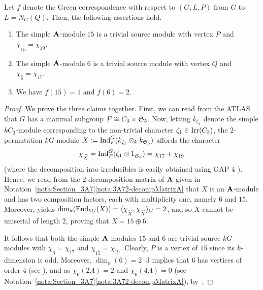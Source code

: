 \begin{lem}\label{lem:tsmInA}
Let $f$ denote the Green correspondence with respect to $(G,L,P)$ from $G$ to $L=N_G(Q)$. Then, the following assertions hold.
\begin{enumerate}[label={\rm(\alph*)}]
    \item The simple ${\mathbf{A}}$-module $15$ is a trivial source module with vertex $P$ and $\chi^{}_{\widehat{15}}=\chi^{}_{19}$.
    \item The simple ${\mathbf{A}}$-module $6$ is
    a trivial source module with vertex $Q$ and $\chi^{}_{\widehat{6}}=\chi^{}_{17}$. 
    \item We have $f(15)=1$ and $f(6)=2$. 
\end{enumerate}
\end{lem}

\begin{proof}
We prove the three claims together. First, we can read from the ATLAS \cite[p.10]{ATLAS} that $G$ has a maximal subgroup $F\cong C_3\times {\mathfrak{S}}_5$. Now, letting $k_{\zeta_1}$ denote the simple $kC_3$-module corresponding to the non-trivial character $\zeta_1\in\operatorname{Irr}(C_3)$, the $2$-permutation $kG$-module $X:=\operatorname{Ind}_F^{G}(k_{\zeta_1}\otimes_kk_{{\mathfrak{S}}_5})$ affords the character 
    \[
        \chi^{}_{\widehat{X}}=\operatorname{Ind}_F^{G}(\zeta_1\otimes 1^{}_{{\mathfrak{S}}_5})=\chi^{}_{17}+\chi^{}_{19}\,
    \] 
(where the decomposition into irreducibles is easily obtained using GAP 4 \cite{GAP}). Hence, we read from the $2$-decomposition matrix of ${\mathbf{A}}$ given in Notation~\ref{nota:Section_3A7}\ref{nota:3A72-decompMatrixA} that $X$ is an ${\mathbf{A}}$-module and  has two composition factors, each with multiplicity one,  namely $6$ and $15$.
Moreover, \cite[II Theorem 12.4]{LandrockBook} yields
$\dim_k(\operatorname{End}_{kG}(X))=\langle \chi^{}_{\widehat{X}} ,\chi^{}_{\widehat{X}}\rangle_G=2$, and so $X$ cannot be uniserial of length $2$, proving that $X=15\oplus 6$.
\par
It follows that both the simple ${\mathbf{A}}$-modules $15$ and $6$ are trivial source $kG$-modules with $\chi^{}_{\widehat{6}}=\chi^{}_{17}$ and $\chi^{}_{\widehat{15}}=\chi^{}_{19}$.  Clearly, $P$ is a vertex of $15$ since its $k$-dimension is odd. Moreover, $\dim_k(6)=2\cdot 3$ implies that $6$ has vertices of order $4$ (see \cite[Lemma~2.2]{Okuyama91}), and as $\chi^{}_{\widehat{6}}(2A)=2$ and $\chi^{}_{\widehat{6}}(4A)=0$ (see Notation~\ref{nota:Section_3A7}\ref{nota:3A72-decompMatrixA}), by~\cite[II Lemma 12.6(ii)+(iii)]{LandrockBook}, 

\end{proof}

